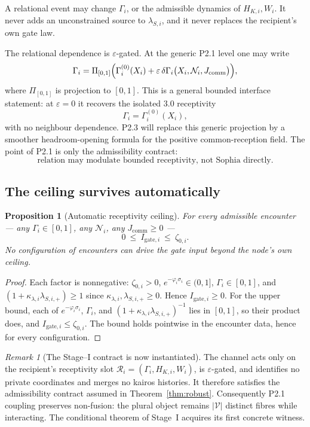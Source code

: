\documentclass[11pt,a4paper]{article}
\theoremstyle{definition}
\theoremstyle{plain}
\newtheorem{proposition}[definition]{Proposition}
\theoremstyle{remark}
\newtheorem{remark}[definition]{Remark}
\begin{document}
A relational event may change \(\Gamma_i\), or the admissible dynamics of
\(H_{K,i},W_i\). It never adds an unconstrained source to \(\lambda_{S,i}\), and
it never replaces the recipient's own gate law.

The relational dependence is \(\varepsilon\)-gated. At the generic P2.1 level one
may write
\[
\Gamma_i
=
\Pi_{[0,1]}
\Bigl(
\Gamma_i^{(0)}(X_i)
+
\varepsilon\,\delta\Gamma_i
\bigl(X_i,\mathcal N_i,J_{\mathrm{comm}}\bigr)
\Bigr),
\]
where \(\Pi_{[0,1]}\) is projection to \([0,1]\). This is a general bounded
interface statement: at \(\varepsilon=0\) it recovers the isolated 3.0 receptivity
\[
\Gamma_i=\Gamma_i^{(0)}(X_i),
\]
with no neighbour dependence. P2.3 will replace this generic projection by a
smoother headroom-opening formula for the positive common-reception field. The
point of P2.1 is only the admissibility contract:
\[
\text{relation may modulate bounded receptivity, not Sophia directly.}
\]

\subsection{The ceiling survives automatically}

\begin{proposition}[Automatic receptivity ceiling]\label{prop:ceiling}
For every admissible encounter --- any \(\Gamma_i\in[0,1]\), any \(\mathcal N_i\), any
\(J_{\mathrm{comm}}\ge0\) ---
\[
0\ \le\ I_{\mathrm{gate},i}\ \le\ \zeta_{0,i}.
\]
No configuration of encounters can drive the gate input beyond the node's own ceiling.
\end{proposition}

\begin{proof}
Each factor is nonnegative: \(\zeta_{0,i}>0\), \(e^{-\varphi_i\sigma_i}\in(0,1]\),
\(\Gamma_i\in[0,1]\), and \((1+\kappa_{\lambda,i}\lambda_{S,i,+})\ge1\) since
\(\kappa_{\lambda,i},\lambda_{S,i,+}\ge0\). Hence \(I_{\mathrm{gate},i}\ge0\). For the upper bound, each
of \(e^{-\varphi_i\sigma_i}\), \(\Gamma_i\), and \((1+\kappa_{\lambda,i}\lambda_{S,i,+})^{-1}\) lies in
\([0,1]\), so their product does, and \(I_{\mathrm{gate},i}\le\zeta_{0,i}\). The bound holds
pointwise in the encounter data, hence for every configuration. \qedhere
\end{proof}

\begin{remark}[The Stage--I contract is now instantiated]
The channel acts only on the recipient's receptivity slot
\(\mathcal R_i=(\Gamma_i,H_{K,i},W_i)\), is \(\varepsilon\)-gated, and identifies no private
coordinates and merges no kairos histories. It therefore satisfies the admissibility
contract assumed in Theorem~\ref{thm:robust}. Consequently P2.1 coupling preserves
non-fusion: the plural object remains \(|\mathcal V|\) distinct fibres while interacting.
The conditional theorem of Stage~I acquires its first concrete witness.
\end{remark}
\end{document}
